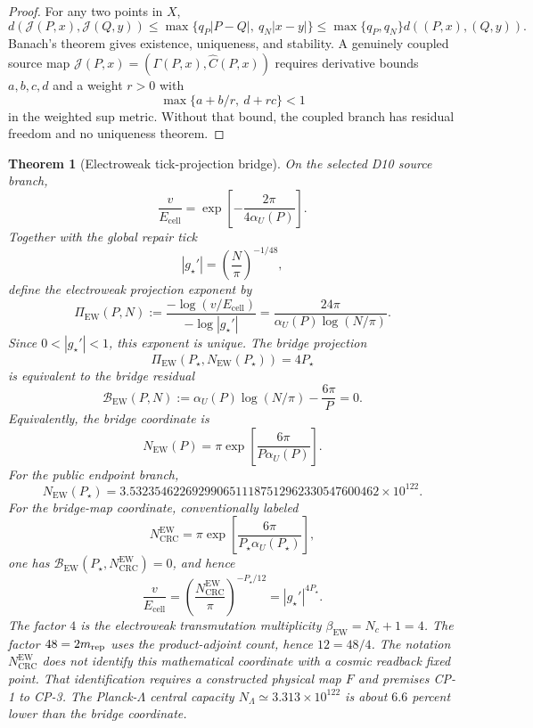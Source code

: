 \documentclass[11pt]{article}
\newtheorem{theorem}{Theorem}[section]
\begin{document}
\begin{proof}
For any two points in \(X\),
\[
d(\mathcal J(P,x),\mathcal J(Q,y))
\le
\max\{q_P|P-Q|,\ q_N|x-y|\}
\le
\max\{q_P,q_N\}d((P,x),(Q,y)).
\]
Banach's theorem gives existence, uniqueness, and stability. A genuinely coupled source map
\(\mathcal J(P,x)=(\Gamma(P,x),\widehat C(P,x))\) requires derivative bounds \(a,b,c,d\) and
a weight \(r>0\) with
\[
\max\{a+b/r,\ d+rc\}<1
\]
in the weighted sup metric. Without that bound, the coupled branch has residual freedom and no
uniqueness theorem.
\end{proof}

\begin{theorem}[Electroweak tick-projection bridge]\label{thm:ew-tick-projection}
On the selected D10 source branch,
\[
\frac{v}{E_{\mathrm{cell}}}
=
\exp\!\left[-\frac{2\pi}{4\alpha_U(P)}\right].
\]
Together with the global repair tick
\[
|g_\star'|=\left(\frac{N}{\pi}\right)^{-1/48},
\]
define the electroweak projection exponent by
\[
\Pi_{\mathrm{EW}}(P,N)
:=
\frac{-\log(v/E_{\mathrm{cell}})}{-\log |g_\star'|}
=
\frac{24\pi}{\alpha_U(P)\log(N/\pi)}.
\]
Since \(0<|g_\star'|<1\), this exponent is unique. The bridge projection
\[
\Pi_{\mathrm{EW}}(P_\star,N_{\mathrm{EW}}(P_\star))=4P_\star
\]
is equivalent to the bridge residual
\[
\mathcal B_{\mathrm{EW}}(P,N)
:=
\alpha_U(P)\log(N/\pi)-\frac{6\pi}{P}
=0.
\]
Equivalently, the bridge coordinate is
\[
N_{\mathrm{EW}}(P)
=
\pi\exp\!\left[\frac{6\pi}{P\alpha_U(P)}\right].
\]
For the public endpoint branch,
\[
N_{\mathrm{EW}}(P_\star)
=
3.5323546226929906511187512962330547600462\times10^{122}.
\]
For the bridge-map coordinate, conventionally labeled
\[
N_{\mathrm{CRC}}^{\mathrm{EW}}
=
\pi\exp\!\left[\frac{6\pi}{P_\star\alpha_U(P_\star)}\right],
\]
one has \(\mathcal B_{\mathrm{EW}}(P_\star,N_{\mathrm{CRC}}^{\mathrm{EW}})=0\), and hence
\[
\frac{v}{E_{\mathrm{cell}}}
=
\left(\frac{N_{\mathrm{CRC}}^{\mathrm{EW}}}{\pi}\right)^{-P_\star/12}
=
|g_\star'|^{4P_\star}.
\]
The factor \(4\) is the electroweak transmutation multiplicity
\(\beta_{\mathrm{EW}}=N_c+1=4\). The factor \(48=2m_{\rm rep}\) uses the
product-adjoint count, hence \(12=48/4\). The notation
\(N_{\mathrm{CRC}}^{\mathrm{EW}}\) does not identify this mathematical coordinate with a cosmic
readback fixed point. That identification requires a constructed physical map \(F\) and premises
CP-1 to CP-3. The Planck-\(\Lambda\) central capacity
\(N_\Lambda\simeq3.313\times10^{122}\) is about \(6.6\) percent lower than the bridge coordinate.
\end{theorem}
\end{document}
